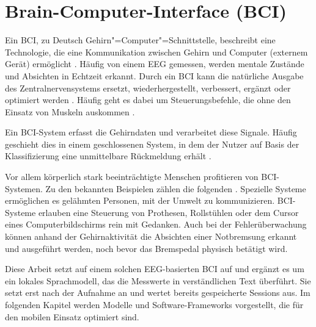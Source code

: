 \section{Brain-Computer-Interface (BCI)}
\label{sec:bci}
Ein \ac{BCI}, zu Deutsch Gehirn"=Computer"=Schnittstelle, beschreibt eine Technologie, die eine Kommunikation zwischen Gehirn und Computer (externem Gerät) ermöglicht \autocite{blum2017}.
Häufig von einem \ac{EEG} gemessen, werden mentale Zustände und Absichten in Echtzeit erkannt. Durch ein \ac{BCI} kann die natürliche Ausgabe des Zentralnervensystems ersetzt, wiederhergestellt, verbessert, ergänzt oder optimiert werden \autocite{wolpaw2013}. Häufig geht es dabei um Steuerungsbefehle, die ohne den Einsatz von Muskeln auskommen \autocite{blum2017}.
\vspace{\baselineskip}

\noindent Ein \ac{BCI}-System erfasst die Gehirndaten und verarbeitet diese Signale. Häufig geschieht dies in einem geschlossenen System, in dem der Nutzer auf Basis der Klassifizierung eine unmittelbare Rückmeldung erhält \autocite{blum2017}.
\vspace{\baselineskip}


\noindent Vor allem körperlich stark beeinträchtigte Menschen profitieren von \ac{BCI}-Systemen. Zu den bekannten Beispielen zählen die folgenden \autocite{blum2017, 10353995}. Spezielle Systeme ermöglichen es gelähmten Personen, mit der Umwelt zu kommunizieren. \ac{BCI}-Systeme erlauben eine Steuerung von Prothesen, Rollstühlen oder dem Cursor eines Computerbildschirms rein mit Gedanken. Auch bei der Fehlerüberwachung können anhand der Gehirnaktivität die Absichten einer Notbremsung erkannt und ausgeführt werden, noch bevor das Bremspedal physisch betätigt wird.
\vspace{\baselineskip}

\noindent Diese Arbeit setzt auf einem solchen \ac{EEG}-basierten \ac{BCI} auf und ergänzt es um ein lokales Sprachmodell, das die Messwerte in verständlichen Text überführt. Sie setzt erst nach der Aufnahme an und wertet bereits gespeicherte Sessions aus. Im folgenden Kapitel werden Modelle und Software-Frameworks vorgestellt, die für den mobilen Einsatz optimiert sind.

